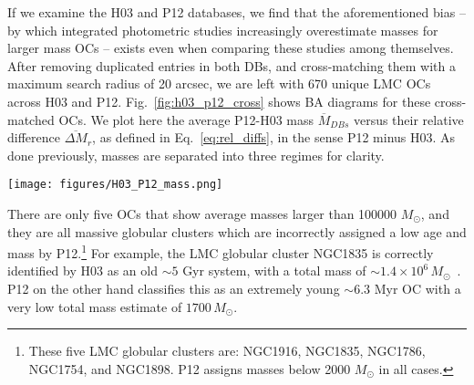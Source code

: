 \documentclass{aa}
\begin{document}
If we examine the H03 and P12 databases, we find that the aforementioned bias
-- by which integrated photometric studies increasingly overestimate masses for
larger mass OCs -- exists even when comparing these studies among themselves.
%
After removing duplicated entries in both DBs, and cross-matching them with
a maximum search radius of 20 arcsec, we are left with 670 unique LMC OCs
across H03 and P12.
Fig.~\ref{fig:h03_p12_cross} shows BA diagrams for these cross-matched OCs.
We plot here the average P12-H03 mass $\overline{M}_{DBs}$
versus their relative difference $\overline{\Delta M}_r$, as defined in
Eq.~\ref{eq:rel_diffs}, in the sense P12 minus H03. As done previously, masses
are separated into three regimes for clarity.
%
\begin{figure*}
\texttt{[image: figures/H03\_P12\_mass.png]}
\caption{\emph{Left}: BA plot for the relative difference between P12 minus H03
masses, for average mass values below 5000 $M_{\odot}$. OCs are colored
according to the difference in their assigned logarithmic ages by each DB --
i.e.: $\Delta \log(age/yr)$ -- in the sense P12 minus H03; see colorbar in the
rightmost plot. The mean and standard deviation for $\overline{\Delta M}_r$ is
shown as a dashed black line and a gray region, respectively.
\emph{Center}: idem, for average DB masses
$5000<\overline{M}_{DB}<20000\,(M_{\odot})$.
\emph{Right}: idem, for average DB masses
$\overline{M}_{DB}>20000\,(M_{\odot})$.}
\label{fig:h03_p12_cross}
\end{figure*}
%
There are only five OCs that show average masses larger than 100000
$M_{\odot}$, and they are all massive globular clusters which are incorrectly
assigned a low age and mass by P12.\footnote{These five LMC globular clusters
are: NGC1916, NGC1835, NGC1786, NGC1754, and NGC1898. P12 assigns masses
below 2000 $M_{\odot}$ in all cases.}
For example, the LMC globular cluster NGC1835 is correctly identified by H03 as
an old ${\sim}5$ Gyr system, with a total mass of
$\sim1.4{\times}10^6\,M_{\odot}$~\citep[a reasonable value,
although a bit overestimated, according to][]{Dubath_1990}. P12 on the
other hand classifies this as an extremely young
${\sim}6.3$ Myr OC with a very low total mass estimate of $1700\,M_{\odot}$.
\end{document}
